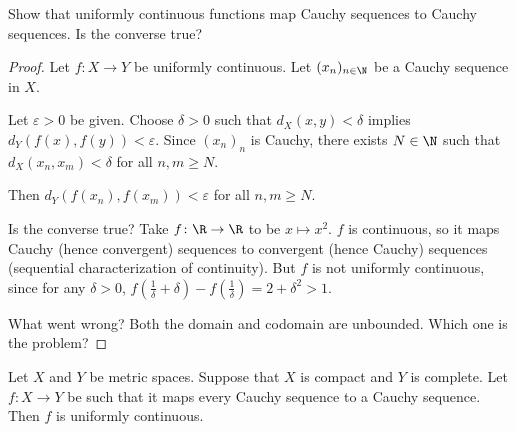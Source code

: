 \documentclass[12pt]{article}
\begin{document}
\begin{problem*}
    Show that uniformly continuous functions map Cauchy sequences to
    Cauchy sequences.
    Is the converse true?
\end{problem*}
\begin{proof}
    Let $f\colon X \to Y$ be uniformly continuous.
    Let $(x_n)_{n \in \N}$ be a Cauchy sequence in $X$.

    Let $\varepsilon > 0$ be given.
    Choose $\delta > 0$ such that $d_X(x, y) < \delta$ implies
    $d_Y(f(x), f(y)) < \varepsilon$.
    Since $(x_n)_n$ is Cauchy, there exists $N \in \N$ such that
    $d_X(x_n, x_m) < \delta$ for all $n, m \ge N$.

    Then $d_Y(f(x_n), f(x_m)) < \varepsilon$ for all $n, m \ge N$.

    Is the converse true?
    Take $f\colon \R \to \R$ to be $x \mapsto x^2$.
    $f$ is continuous, so it maps Cauchy (hence convergent) sequences
    to convergent (hence Cauchy) sequences
    (sequential characterization of continuity).
    But $f$ is not uniformly continuous, since for any $\delta > 0$,
    $f(\frac1{\delta} + \delta) - f(\frac1{\delta}) = 2 + \delta^2 > 1$.

    What went wrong?
    Both the domain and codomain are unbounded.
    Which one is the problem?
\end{proof}

\begin{proposition} \label{thm:cauchy_unif_when}
    Let $X$ and $Y$ be metric spaces.
    Suppose that $X$ is compact and $Y$ is complete.
    Let $f\colon X \to Y$ be such that it maps every Cauchy sequence
    to a Cauchy sequence.
    Then $f$ is uniformly continuous.
\end{proposition}
\end{document}
